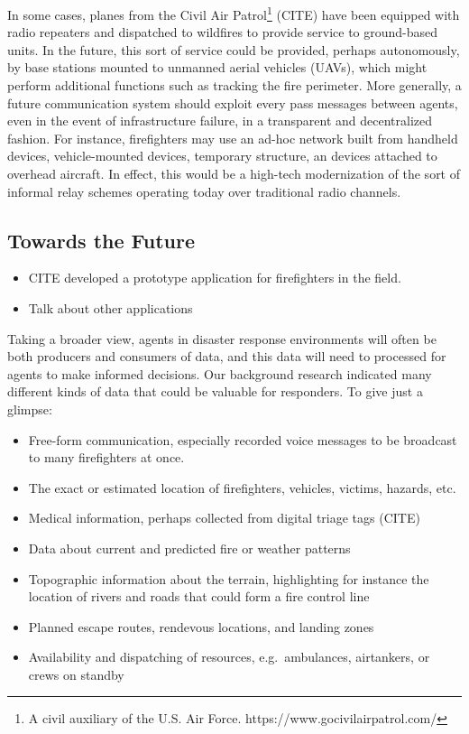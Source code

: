 \documentclass[]             %
{NASA}                       %
\theoremstyle{definition}
\providecommand{\tightlist}{%
  \setlength{\itemsep}{0pt}\setlength{\parskip}{0pt}}
\begin{document}
In some cases, planes from the Civil Air Patrol\footnote{A civil
  auxiliary of the U.S. Air Force. https://www.gocivilairpatrol.com/}
(CITE) have been equipped with radio repeaters and dispatched to
wildfires to provide service to ground-based units. In the future, this
sort of service could be provided, perhaps autonomously, by base
stations mounted to unmanned aerial vehicles (UAVs), which might perform
additional functions such as tracking the fire perimeter. More
generally, a future communication system should exploit every pass
messages between agents, even in the event of infrastructure failure, in
a transparent and decentralized fashion. For instance, firefighters may
use an ad-hoc network built from handheld devices, vehicle-mounted
devices, temporary structure, an devices attached to overhead aircraft.
In effect, this would be a high-tech modernization of the sort of
informal relay schemes operating today over traditional radio channels.

\hypertarget{towards-the-future}{%
\subsection{Towards the Future}\label{towards-the-future}}

\begin{itemize}
\tightlist
\item
  CITE developed a prototype application for firefighters in the field.
\item
  Talk about other applications
\end{itemize}

Taking a broader view, agents in disaster response environments will
often be both producers and consumers of data, and this data will need
to processed for agents to make informed decisions. Our background
research indicated many different kinds of data that could be valuable
for responders. To give just a glimpse:

\begin{itemize}
\tightlist
\item
  Free-form communication, especially recorded voice messages to be
  broadcast to many firefighters at once.
\item
  The exact or estimated location of firefighters, vehicles, victims,
  hazards, etc.
\item
  Medical information, perhaps collected from digital triage tags (CITE)
\item
  Data about current and predicted fire or weather patterns
\item
  Topographic information about the terrain, highlighting for instance
  the location of rivers and roads that could form a fire control line
\item
  Planned escape routes, rendevous locations, and landing zones
\item
  Availability and dispatching of resources, e.g.~ambulances,
  airtankers, or crews on standby
\end{itemize}
\end{document}

